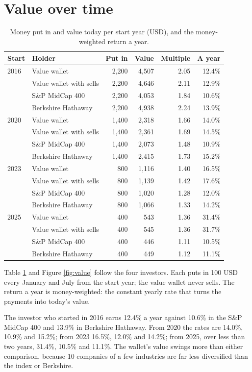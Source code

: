 \documentclass[11pt,a4paper]{article}
\begin{document}
\section{Value over time}
\begin{table}[H]
\centering
\small
\caption{Money put in and value today per start year (USD), and the money-weighted return a year.}\label{tab:value}
\begin{tabular}{l l r r r r}
\hline
Start & Holder & Put in & Value & Multiple & A year \\
\hline
2016 & Value wallet & 2,200 & 4,507 & 2.05 & 12.4\% \\
 & Value wallet with sells & 2,200 & 4,646 & 2.11 & 12.9\% \\
 & S\&P MidCap 400 & 2,200 & 4,053 & 1.84 & 10.6\% \\
 & Berkshire Hathaway & 2,200 & 4,938 & 2.24 & 13.9\% \\
\hline
2020 & Value wallet & 1,400 & 2,318 & 1.66 & 14.0\% \\
 & Value wallet with sells & 1,400 & 2,361 & 1.69 & 14.5\% \\
 & S\&P MidCap 400 & 1,400 & 2,073 & 1.48 & 10.9\% \\
 & Berkshire Hathaway & 1,400 & 2,415 & 1.73 & 15.2\% \\
\hline
2023 & Value wallet & 800 & 1,116 & 1.40 & 16.5\% \\
 & Value wallet with sells & 800 & 1,139 & 1.42 & 17.6\% \\
 & S\&P MidCap 400 & 800 & 1,020 & 1.28 & 12.0\% \\
 & Berkshire Hathaway & 800 & 1,066 & 1.33 & 14.2\% \\
\hline
2025 & Value wallet & 400 & 543 & 1.36 & 31.4\% \\
 & Value wallet with sells & 400 & 545 & 1.36 & 31.7\% \\
 & S\&P MidCap 400 & 400 & 446 & 1.11 & 10.5\% \\
 & Berkshire Hathaway & 400 & 449 & 1.12 & 11.1\% \\
\hline
\end{tabular}
\end{table}
Table \ref{tab:value} and Figure \ref{fig:value} follow the four investors. Each puts in 100 USD every January and July from the start year; the value wallet never sells. The return a year is money-weighted: the constant yearly rate that turns the payments into today's value.

The investor who started in 2016 earns 12.4\% a year against 10.6\% in the S\&P MidCap 400 and 13.9\% in Berkshire Hathaway. From 2020 the rates are 14.0\%, 10.9\% and 15.2\%; from 2023 16.5\%, 12.0\% and 14.2\%; from 2025, over less than two years, 31.4\%, 10.5\% and 11.1\%. The wallet's value swings more than either comparison, because 10 companies of a few industries are far less diversified than the index or Berkshire.
\end{document}
